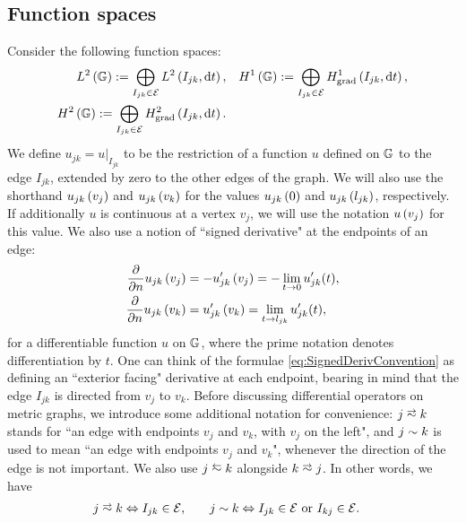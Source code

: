 \subsection{Function spaces} \label{ssec:FunctionSpaces}
Consider the following function spaces:
\begin{subequations} \label{eq:GraphFuncSpaces}
	\begin{align}
		L^2\left( \mathbb{G} \right) := \bigoplus_{I_{jk}\in \mathcal{E}} L^{2}\left( I_{jk},\mathrm{d}t \right),
		&\quad H^1\left( \mathbb{G} \right) := \bigoplus_{I_{jk}\in \mathcal{E}} H^1_\mathrm{grad}\left( I_{jk}, \mathrm{d}t \right), \\
		H^2\left( \mathbb{G} \right) := \bigoplus_{I_{jk}\in \mathcal{E}} H^2_\mathrm{grad}\left( I_{jk}, \mathrm{d} t \right). &
	\end{align}
\end{subequations}
We define $u_{jk} = u\vert_{I_{jk}}$ to be the restriction of a function $u$ defined on $\mathbb{G}$ to the edge $I_{jk}$, extended by zero to the other edges of the graph.
We will also use the shorthand $u_{jk}\left( v_j \right)$ and $u_{jk}\left( v_k \right)$ for the values $u_{jk}\left( 0 \right)$ and $u_{jk}\left( l_{jk} \right)$, respectively.
If additionally $u$ is continuous at a vertex $v_j$, we will use the notation $u\left( v_j \right)$ for this value.
We also use a notion of ``signed derivative" at the endpoints of an edge:
\begin{subequations} \label{eq:SignedDerivConvention}
	\begin{align}
		\dfrac{\partial }{\partial n}u_{jk}\left( v_j \right) &= -u_{jk}'\left( v_j \right) = -\lim_{t\rightarrow0}u_{jk}'(t), \\
		\dfrac{\partial }{\partial n}u_{jk}\left( v_k \right) &= u_{jk}'\left( v_k \right) = \lim_{t\rightarrow l_{jk}}u_{jk}'(t),
	\end{align}
\end{subequations}
for a differentiable function $u$ on $\mathbb{G}$, where the prime notation denotes differentiation by $t$.
One can think of the formulae \eqref{eq:SignedDerivConvention} as defining an ``exterior facing" derivative at each endpoint, bearing in mind that the edge $I_{jk}$ is directed from $v_j$ to $v_k$.
Before discussing differential operators on metric graphs, we introduce some additional notation for convenience: $j\conLeft k$ stands for ``an edge with endpoints $v_j$ and $v_k$, with $v_j$ on the left", and $j\sim k$ is used to mean ``an edge with endpoints $v_j$ and $v_k$", whenever the direction of the edge is not important.
We also use $j \conRight k$ alongside $k\conLeft j$.
In other words, we have
\begin{align*}
	j\conLeft k \Leftrightarrow I_{jk}\in \edgeSet, &\qquad
	j\con k \Leftrightarrow I_{jk}\in \edgeSet \text{ or } I_{kj}\in \edgeSet.
\end{align*}
